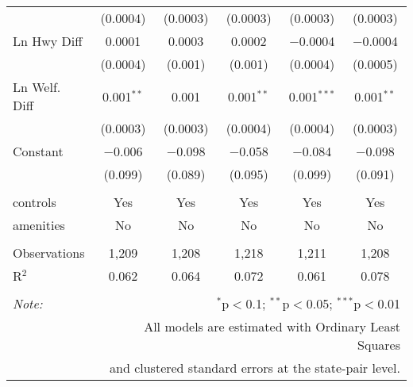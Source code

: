 \begin{table}[!htbp]
\begin{tabular}{@{\extracolsep{5pt}}lccccc}
  & (0.0004) & (0.0003) & (0.0003) & (0.0003) & (0.0003) \\ 
  Ln Hwy Diff & 0.0001 & 0.0003 & 0.0002 & $-$0.0004 & $-$0.0004 \\ 
  & (0.0004) & (0.001) & (0.001) & (0.0004) & (0.0005) \\ 
  Ln Welf. Diff & 0.001$^{**}$ & 0.001 & 0.001$^{**}$ & 0.001$^{***}$ & 0.001$^{**}$ \\ 
  & (0.0003) & (0.0003) & (0.0004) & (0.0004) & (0.0003) \\ 
  Constant & $-$0.006 & $-$0.098 & $-$0.058 & $-$0.084 & $-$0.098 \\ 
  & (0.099) & (0.089) & (0.095) & (0.099) & (0.091) \\ 
 \hline \\[-1.8ex] 
controls & Yes & Yes & Yes & Yes & Yes \\ 
amenities & No & No & No & No & No \\ 
\hline \\[-1.8ex] 
Observations & 1,209 & 1,208 & 1,218 & 1,211 & 1,208 \\ 
R$^{2}$ & 0.062 & 0.064 & 0.072 & 0.061 & 0.078 \\ 
\hline 
\hline \\[-1.8ex] 
\textit{Note:}  & \multicolumn{5}{r}{$^{*}$p$<$0.1; $^{**}$p$<$0.05; $^{***}$p$<$0.01} \\ 
 & \multicolumn{5}{r}{All models are estimated with Ordinary Least Squares} \\ 
 & \multicolumn{5}{r}{and clustered standard errors at the state-pair level.} \\ 
\end{tabular} 
\end{table} 
